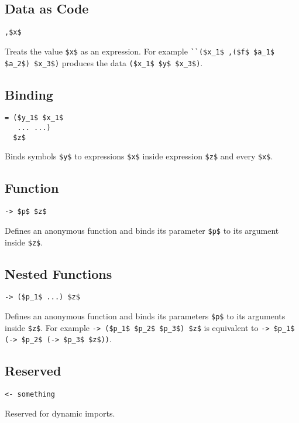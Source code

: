 \documentclass{article}
\begin{document}
\begin{multicols}
\bigskip\subsection*{Data as Code}
\begin{lstlisting}
,$x$
\end{lstlisting}
Treats the value \lstinline{$x$} as an expression.
For example \lstinline{``($x_1$ ,($f$ $a_1$ $a_2$) $x_3$)}
produces the data \lstinline{($x_1$ $y$ $x_3$)}.

\bigskip\subsection*{Binding}
\begin{lstlisting}
= ($y_1$ $x_1$
   ... ...)
  $z$
\end{lstlisting}
Binds symbols \lstinline{$y$} to expressions \lstinline{$x$}
inside expression \lstinline{$z$} and every \lstinline{$x$}.

\bigskip\subsection*{Function}
\begin{lstlisting}
-> $p$ $z$
\end{lstlisting}
Defines an anonymous function
and binds its parameter \lstinline{$p$} to its argument
inside \lstinline{$z$}.

\bigskip\subsection*{Nested Functions}
\begin{lstlisting}
-> ($p_1$ ...) $z$
\end{lstlisting}
Defines an anonymous function and
binds its parameters \lstinline{$p$} to its arguments inside \lstinline{$z$}.
For example \lstinline{-> ($p_1$ $p_2$ $p_3$) $z$}
is equivalent to \lstinline{-> $p_1$ (-> $p_2$ (-> $p_3$ $z$))}.

\bigskip\subsection*{Reserved}
\begin{lstlisting}
<- something
\end{lstlisting}
Reserved for dynamic imports.

\columnbreak


\end{multicols}
\end{document}
